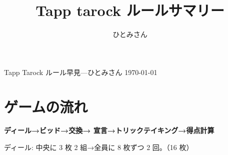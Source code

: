 \documentclass[line_length=50zw,head_space=2cm,foot_space=2cm]{jlreq}
\begin{document}
\pagestyle{empty}

\vspace{-1cm}
\title{Tapp tarock ルールサマリー}
\author{ひとみさん}

\begin{center}
{\LARGE Tapp Tarock ルール早見}---ひとみさん \today
\end{center}
\bigskip

\setlength{\parindent}{0pt}

\section{ゲームの流れ}
\textbf{\mbox{ディール}\hfill →\hfill\mbox{ビッド}\hfill →\hfill\mbox{交換}\hfill →\hfill
\mbox{宣言}\hfill →\hfill\mbox{トリックテイキング}\hfill →\hfill\mbox{得点計算}\hfill}

ディール: 中央に 3 枚 2 組→全員に 8 枚ずつ 2 回。（16 枚）
\end{document}
